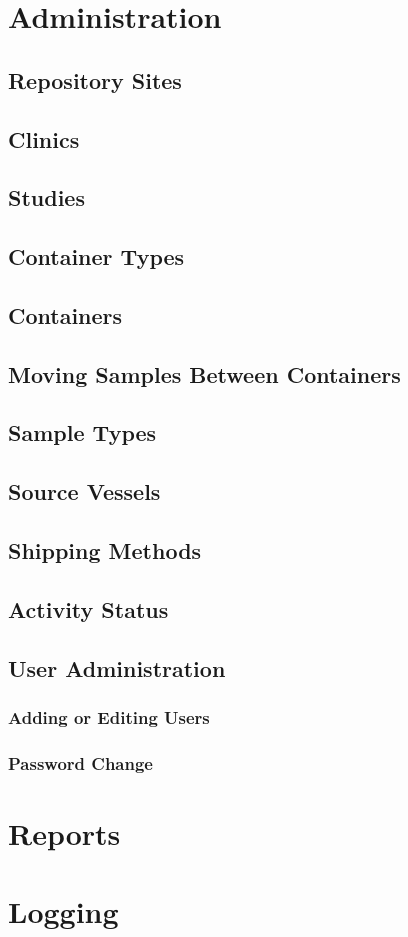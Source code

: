 \chapter{Administration}
\label{chap:administration}

\section{Repository Sites}
\section{Clinics}
\section{Studies}
\section{Container Types}
\section{Containers}
\section{Moving Samples Between Containers}
\section{Sample Types}
\section{Source Vessels}
\section{Shipping Methods}
\section{Activity Status}
\section{User Administration}
\subsection{Adding or Editing Users}
\subsection{Password Change}
\chapter{Reports}
\chapter{Logging}
